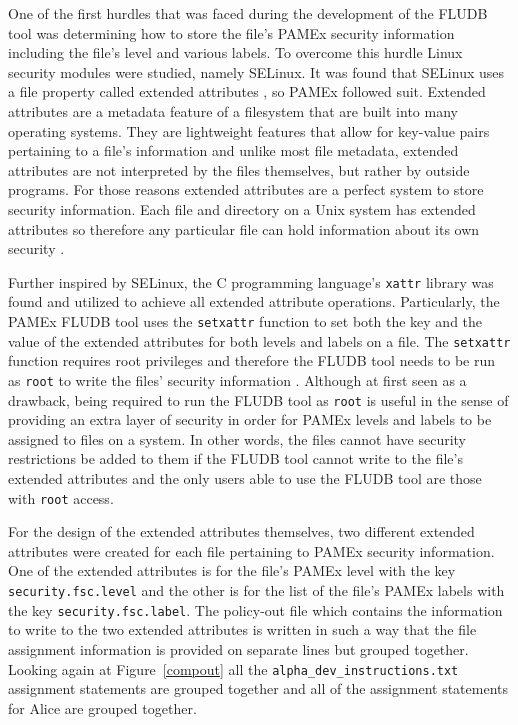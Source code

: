 One of the first hurdles that was faced during the development of the 
FLUDB tool was determining how to store the file’s PAMEx security 
information including the file’s level and various labels. To overcome this hurdle Linux security modules were studied, namely SELinux. 
It was found that SELinux uses a file property called extended 
attributes \cite{selinux}, so PAMEx followed suit. Extended attributes are a metadata 
feature of a filesystem that are built into many operating systems. 
They are lightweight features that allow for key-value pairs pertaining 
to a file’s information and unlike most file metadata, extended 
attributes are not interpreted by the files themselves, but rather by 
outside programs. For those reasons extended attributes are a perfect 
system to store security information. Each file and directory on a Unix 
system has extended attributes so therefore any particular file can 
hold information about its own security \cite{man7xattr}.   

Further inspired by SELinux, the C 
programming language’s \texttt{xattr} library was found and utilized to achieve all extended 
attribute operations. Particularly, the PAMEx FLUDB tool uses the 
\texttt{setxattr} function to set both the key and the value of the extended 
attributes for both levels and labels on a file. The \texttt{setxattr} function 
requires root privileges and therefore the FLUDB tool needs to be run 
as \texttt{root} to write the files’ security information \cite{man7xattr}. Although at first 
seen as a drawback, being required to run the FLUDB tool 
as \texttt{root} is useful in the sense of providing an extra layer of security 
in order for PAMEx levels and labels to be assigned to files on a 
system. In other words, the files cannot have security restrictions be 
added to them if the FLUDB tool cannot write to the file’s extended 
attributes and the only users able to use the FLUDB tool are those with \texttt{root} access.  

For the design of the extended attributes themselves, two different extended attributes were created for each file pertaining to 
PAMEx security information. One of the extended attributes is for the 
file’s PAMEx level with the key \texttt{security.fsc.level} and the other is for 
the list of the file’s PAMEx labels with the key \texttt{security.fsc.label}. 
The policy-out file which contains the information to write to the two 
extended attributes is written in such a way that the file assignment 
information is provided on separate lines but grouped together. Looking
again at Figure~\ref{compout} all the \texttt{alpha}\texttt{\_dev}\texttt{\_instructions.txt}
assignment statements are grouped together and all of the assignment statements
for Alice are grouped together.

